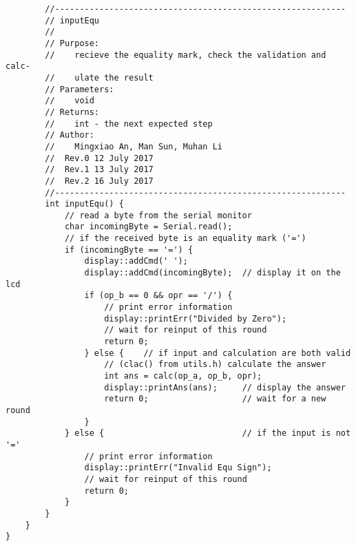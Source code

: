 \begin{verbatim}
        //-----------------------------------------------------------  
        // inputEqu 
        //  
        // Purpose:  
        //    recieve the equality mark, check the validation and calc-
        //    ulate the result
        // Parameters:  
        //    void 
        // Returns:  
        //    int - the next expected step   
        // Author:  
        //    Mingxiao An, Man Sun, Muhan Li
        //  Rev.0 12 July 2017
        //  Rev.1 13 July 2017
        //  Rev.2 16 July 2017
        //----------------------------------------------------------- 
        int inputEqu() {
            // read a byte from the serial monitor
            char incomingByte = Serial.read();
            // if the received byte is an equality mark ('=')
            if (incomingByte == '=') {
                display::addCmd(' ');
                display::addCmd(incomingByte);  // display it on the lcd
                if (op_b == 0 && opr == '/') {
                    // print error information
                    display::printErr("Divided by Zero");
                    // wait for reinput of this round
                    return 0;
                } else {    // if input and calculation are both valid
                    // (clac() from utils.h) calculate the answer
                    int ans = calc(op_a, op_b, opr);
                    display::printAns(ans);     // display the answer
                    return 0;                   // wait for a new round
                }
            } else {                            // if the input is not '='
                // print error information
                display::printErr("Invalid Equ Sign");
                // wait for reinput of this round
                return 0;
            }
        }
    }
}

\end{verbatim}

